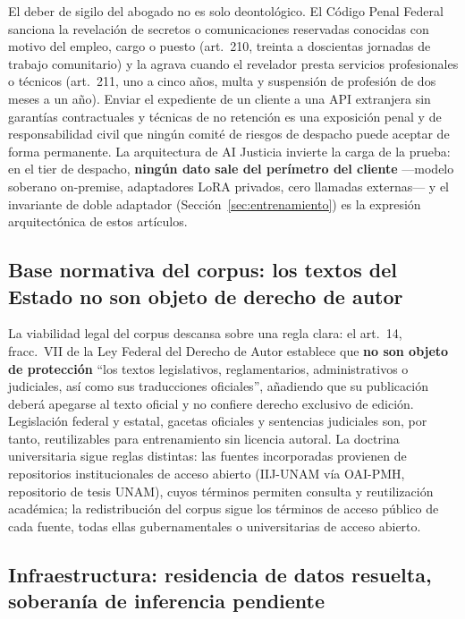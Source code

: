 El deber de sigilo del abogado no es solo deontológico. El Código Penal Federal sanciona la revelación de secretos o comunicaciones reservadas conocidas con motivo del empleo, cargo o puesto (art.~210, treinta a doscientas jornadas de trabajo comunitario) y la agrava cuando el revelador presta servicios profesionales o técnicos (art.~211, uno a cinco años, multa y suspensión de profesión de dos meses a un año).\cite{cpf} Enviar el expediente de un cliente a una API extranjera sin garantías contractuales y técnicas de no retención es una exposición penal y de responsabilidad civil que ningún comité de riesgos de despacho puede aceptar de forma permanente. La arquitectura de AI Justicia invierte la carga de la prueba: en el tier de despacho, \textbf{ningún dato sale del perímetro del cliente} ---modelo soberano on-premise, adaptadores LoRA privados, cero llamadas externas--- y el invariante de doble adaptador (Sección~\ref{sec:entrenamiento}) es la expresión arquitectónica de estos artículos.

\subsection{Base normativa del corpus: los textos del Estado no son objeto de derecho de autor}

La viabilidad legal del corpus descansa sobre una regla clara: el art.~14, fracc.~VII de la Ley Federal del Derecho de Autor establece que \textbf{no son objeto de protección} ``los textos legislativos, reglamentarios, administrativos o judiciales, así como sus traducciones oficiales'', añadiendo que su publicación deberá apegarse al texto oficial y no confiere derecho exclusivo de edición.\cite{lfda} Legislación federal y estatal, gacetas oficiales y sentencias judiciales son, por tanto, reutilizables para entrenamiento sin licencia autoral. La doctrina universitaria sigue reglas distintas: las fuentes incorporadas provienen de repositorios institucionales de acceso abierto (IIJ-UNAM vía OAI-PMH, repositorio de tesis UNAM), cuyos términos permiten consulta y reutilización académica; la redistribución del corpus sigue los términos de acceso público de cada fuente, todas ellas gubernamentales o universitarias de acceso abierto.

\subsection{Infraestructura: residencia de datos resuelta, soberanía de inferencia pendiente}

